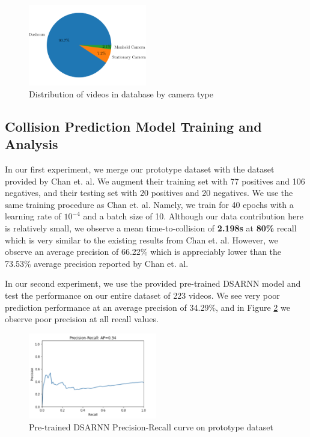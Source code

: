 \documentclass[letterpaper, 10 pt, conference]{ieeeconf}
\begin{document}
\begin{figure}[!h]
    \centering
    \includegraphics[width=0.46\textwidth,trim={0 1cm 0 1cm},clip]{by-camera.png}
    \caption{Distribution of videos in database by camera type}
    \label{fig:vids-by-camera}
\end{figure}

\subsection{Collision Prediction Model Training and Analysis}
\label{section-collision-prediction}
In our first experiment, we merge our prototype dataset with the dataset provided by Chan et. al. We augment their training set with 77 positives and 106 negatives, and their testing set with 20 positives and 20 negatives. We use the same training procedure as Chan et. al. Namely, we train for 40 epochs with a learning rate of $10^{-4}$ and a batch size of 10. Although our data contribution here is relatively small, we observe a mean time-to-collision of \textbf{2.198s} at \textbf{80\%} recall which is very similar to the existing results from Chan et. al. However, we observe an average precision of 66.22\% which is appreciably lower than the 73.53\% average precision reported by Chan et. al. \cite{chan2016anticipating}

In our second experiment, we use the provided pre-trained DSARNN model and test the performance on our entire dataset of 223 videos. We see very poor prediction performance at an average precision of 34.29\%, and in Figure \ref{fig:pr_curve} we observe poor precision at all recall values.

\begin{figure}[!htbp]
        \centering
        \includegraphics[width=0.5\textwidth]{prcurve.png}
        \caption{Pre-trained DSARNN Precision-Recall curve on prototype dataset}
        \label{fig:pr_curve}
\end{figure}
\end{document}
